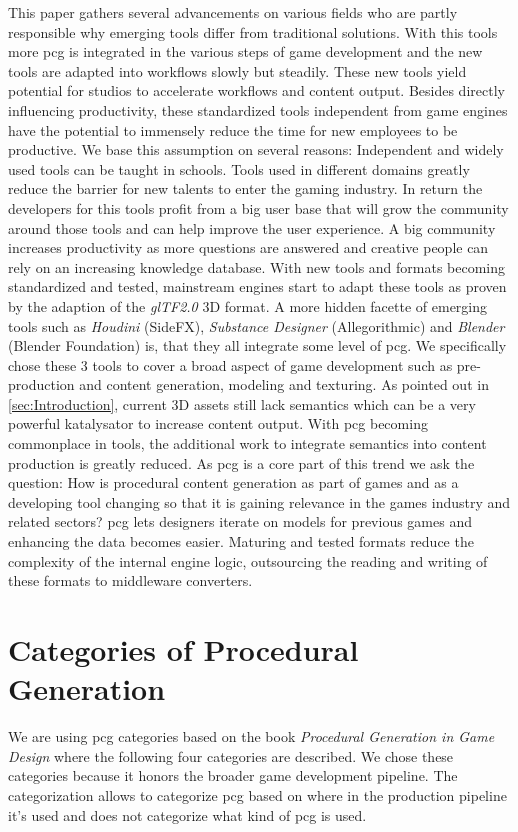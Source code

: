 \documentclass[10pt,a4paper]{article}
\begin{document}
\begin{multicols}{2}
This paper gathers several advancements on various fields who are partly responsible why emerging tools differ from traditional solutions. With this tools more \gls{pcg} is integrated in the various steps of game development and the new tools are adapted into workflows slowly but steadily. These new tools yield potential for studios to accelerate workflows and content output. Besides directly influencing productivity, these standardized tools independent from game engines have the potential to immensely reduce the time for new employees to be productive. We base this assumption on several reasons: Independent and widely used tools can be taught in schools. Tools used in different domains greatly reduce the barrier for new talents to enter the gaming industry. In return the developers for this tools profit from a big user base that will grow the community around those tools and can help improve the user experience. A big community increases productivity as more questions are answered and creative people can rely on an increasing knowledge database. With new tools and formats becoming standardized and tested, mainstream engines start to adapt these tools as proven by the adaption of the \textit{glTF2.0} 3D format\cite{Group2018}. A more hidden facette of emerging tools such as \textit{Houdini} (SideFX), \textit{Substance Designer} (Allegorithmic) and \textit{Blender} (Blender Foundation) is, that they all integrate some level of \gls{pcg}. We specifically chose these 3 tools to cover a broad aspect of game development such as pre-production and content generation, modeling and texturing. As pointed out in \autoref{sec:Introduction}, current 3D assets still lack semantics which can be a very powerful katalysator to increase content output. With \gls{pcg} becoming commonplace in tools, the additional work to integrate semantics into content production is greatly reduced. As \gls{pcg} is a core part of this trend we ask the question: How is procedural content generation as part of games and as a developing tool changing so that it is gaining relevance in the games industry and related sectors? \gls{pcg} lets designers iterate on models for previous games and enhancing the data becomes easier. Maturing and tested formats reduce the complexity of the internal engine logic, outsourcing the reading and writing of these formats to middleware converters.
\end{multicols}
\section{Categories of Procedural Generation}\label{sec:categories}
\begin{multicols}{2}
We are using \gls{pcg} categories based on the book \textit{Procedural Generation in Game Design}\citep[p.~3]{Short:2017:PGG:3161477} where the following four categories are described. We chose these categories because it honors the broader game development pipeline. The categorization allows to categorize \gls{pcg} based on where in the production pipeline it’s used and does not categorize what kind of \gls{pcg} is used.
\end{multicols}
\end{document}
